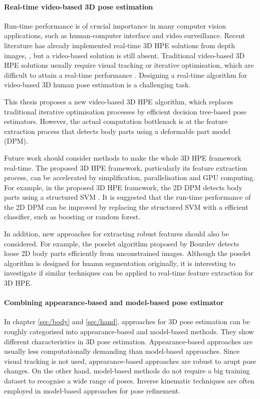 \paragraph{Real-time video-based 3D pose estimation}
Run-time performance is of crucial importance in many computer vision applications, such as human-computer interface and video surveillance. Recent literature has already implemented real-time 3D HPE solutions from depth images, \eg \cite{Baak2011, Girshick2011, Sun2012}, but a video-based solution is still absent. Traditional video-based 3D HPE solutions usually require visual tracking or iterative optimisation, which are difficult to attain a real-time performance \cite{Pons-Moll2011, Sigal2012}. Designing a real-time algorithm for video-based 3D human pose estimation is a challenging task. 

This thesis proposes a new video-based 3D HPE algorithm, which replaces traditional iterative optimisation processes by efficient decision tree-based pose estimators. However, the actual computation bottlenack is at the feature extraction process that detects body parts using a deformable part model (DPM). 

Future work should consider methods to make the whole 3D HPE framework real-time. 
The proposed 3D HPE framework, particularly its feature extraction process, can be accelerated by simplification, parallelisation and GPU computing. 
For example, in the proposed 3D HPE framework, the 2D DPM detects body parts using a structured SVM \cite{Yang2011}. It is suggested that the run-time performance of the 2D DPM can be improved by replacing the structured SVM with a efficient classifier, such as boosting or random forest.

In addition, new approaches for extracting robust features should also be considered.  
For example, the poselet algorithm proposed by Bourdev \etal \cite{Bourdev2009} detects loose 2D body parts efficiently from unconstrained images. Although the poselet algorithm is designed for huamn segmentation originally, it is interesting to investigate if similar techniques can be applied to real-time feature extraction for 3D HPE. 

\paragraph{Combining appearance-based and model-based pose estimator}

In chapter \ref{sec/body} and \ref{sec/hand}, approaches for 3D pose estimation can be roughly categorised into appearance-based and model-based methods.  They show different characteristics in 3D pose estimation.
Appearance-based approaches are usually less computationally demanding than model-based approaches. 
Since visual tracking is not used, appearance-based approaches are robust to arupt pose changes.
On the other hand, model-based methods do not require a big training dataset to recognise a wide range of poses. Inverse kinematic techniques are often employed in model-based approaches for pose refinement. 

